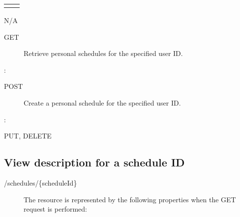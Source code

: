 \documentclass[letterpaper,10pt,english]{sphinxmanual}
\begin{document}
\begin{savenotes}\sphinxattablestart
\centering
\begin{tabulary}{\linewidth}[t]{|T|T|}
\hline

&
\\
\hline&\\
\hline
\end{tabulary}
\par
\sphinxattableend\end{savenotes}

 N/A
\begin{description}
\item[{ GET}] \leavevmode
Retrieve personal schedules for the specified user ID.

\end{description}

:

\begin{sphinxVerbatim}[commandchars=\\\{\}]
\end{sphinxVerbatim}
\begin{description}
\item[{ POST}] \leavevmode
Create a personal schedule for the specified user ID.

\end{description}

:

\begin{sphinxVerbatim}[commandchars=\\\{\}]
\end{sphinxVerbatim}

 PUT, DELETE


\subsection{View description for a schedule ID}
\label{\detokenize{restapi:view-description-for-a-schedule-id}}
 /schedules/\{scheduleId\}
\begin{description}
\item[{}] \leavevmode
The resource is represented by the following properties when the GET request is performed:

\end{description}
\end{document}
